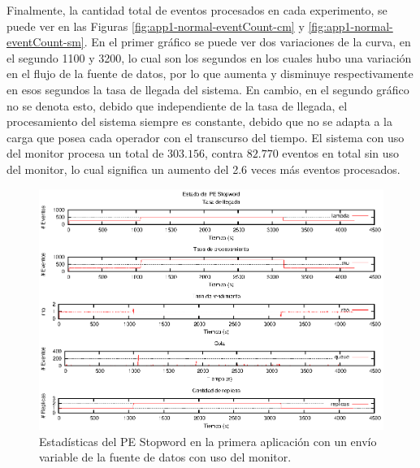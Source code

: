 Finalmente, la cantidad total de eventos procesados en cada experimento, se puede ver en las Figuras \ref{fig:app1-normal-eventCount-cm} y \ref{fig:app1-normal-eventCount-sm}. En el primer gráfico se puede ver dos variaciones de la curva, en el segundo 1100 y 3200, lo cual son los segundos en los cuales hubo una variación en el flujo de la fuente de datos, por lo que aumenta y disminuye respectivamente en esos segundos la tasa de llegada del sistema. En cambio, en el segundo gráfico no se denota esto, debido que independiente de la tasa de llegada, el procesamiento del sistema siempre es constante, debido que no se adapta a la carga que posea cada operador con el transcurso del tiempo. El sistema con uso del monitor procesa un total de $303.156$, contra $82.770$ eventos en total sin uso del monitor, lo cual significa un aumento del 2.6 veces más eventos procesados.

\begin{figure}[p]
\centering
    \includegraphics[scale=1.1]{images/exp/app1/normal/cm/statusStopwordPE.eps}
    \caption{Estadísticas del PE Stopword en la primera aplicación con un envío variable de la fuente de datos con uso del monitor.}
    \label{fig:app1-normal-statusStopwordPE-cm}
\end{figure}

